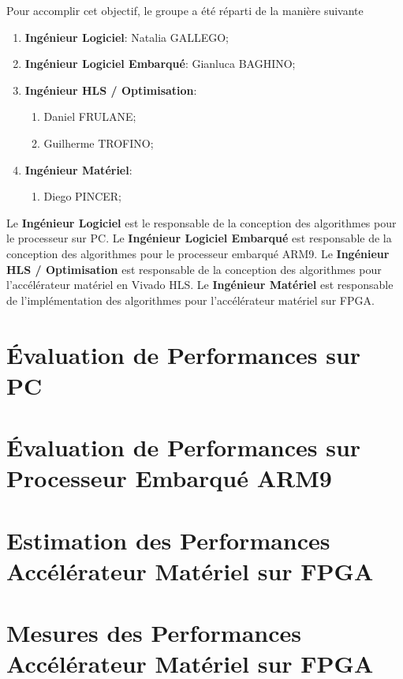 \documentclass[journal]{IEEEtran}
\begin{document}
Pour accomplir cet objectif, le groupe a été réparti de la manière suivante
\begin{enumerate}
    \item \textbf{Ingénieur Logiciel}: Natalia GALLEGO;
    \item \textbf{Ingénieur Logiciel Embarqué}: Gianluca BAGHINO;
    \item \textbf{Ingénieur HLS / Optimisation}:
    \begin{enumerate}
        \item Daniel FRULANE;
        \item Guilherme TROFINO;
    \end{enumerate}
    \item \textbf{Ingénieur Matériel}:
    \begin{enumerate}
        \item Diego PINCER;
    \end{enumerate}
\end{enumerate}

Le \textbf{Ingénieur Logiciel} est le responsable de la conception des algorithmes pour le processeur sur PC. Le \textbf{Ingénieur Logiciel Embarqué} est responsable de la conception des algorithmes pour le processeur embarqué ARM9. Le \textbf{Ingénieur HLS / Optimisation} est responsable de la conception des algorithmes pour l'accélérateur matériel en Vivado HLS. Le \textbf{Ingénieur Matériel} est responsable de l'implémentation des algorithmes pour l'accélérateur matériel sur FPGA.




    
\section{Évaluation de Performances sur PC}

\section{Évaluation de Performances sur Processeur Embarqué ARM9}

\section{Estimation des Performances Accélérateur Matériel sur FPGA}

\section{Mesures des Performances Accélérateur Matériel sur FPGA}


\end{document}
